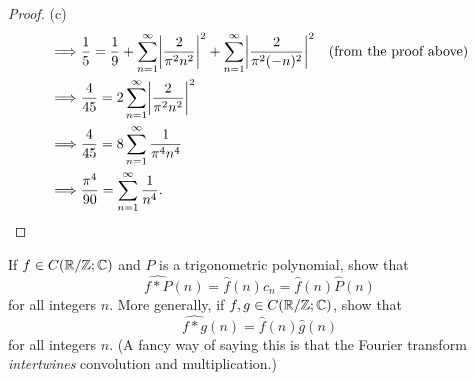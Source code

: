 \begin{proof}{(c)}
\begin{align*}
    \implies & \frac{1}{5} = \frac{1}{9} + \sum_{n = 1}^\infty \abs{\frac{2}{\pi^2 n^2}}^2 + \sum_{n = 1}^\infty \abs{\frac{2}{\pi^2 (-n)^2}}^2 & \text{(from the proof above)} \\
    \implies & \frac{4}{45} = 2 \sum_{n = 1}^\infty \abs{\frac{2}{\pi^2 n^2}}^2                                                                                                 \\
    \implies & \frac{4}{45} = 8 \sum_{n = 1}^\infty \frac{1}{\pi^4 n^4}                                                                                                         \\
    \implies & \frac{\pi^4}{90} = \sum_{n = 1}^\infty \frac{1}{n^4}.
  \end{align*}
\end{proof}

\begin{ex}\label{ex:5.5.3}
  If \(f \in C(\mathbb{R} / \mathbb{Z} ; \mathbb{C})\) and \(P\) is a trigonometric polynomial, show that
  \[
    \widehat{f * P}(n) = \hat{f}(n) c_n = \hat{f}(n) \hat{P}(n)
  \]
  for all integers \(n\).
  More generally, if \(f, g \in C(\mathbb{R} / \mathbb{Z} ; \mathbb{C})\), show that
  \[
    \widehat{f * g}(n) = \hat{f}(n) \hat{g}(n)
  \]
  for all integers \(n\).
  (A fancy way of saying this is that the Fourier transform \emph{intertwines} convolution and multiplication.)
\end{ex}

